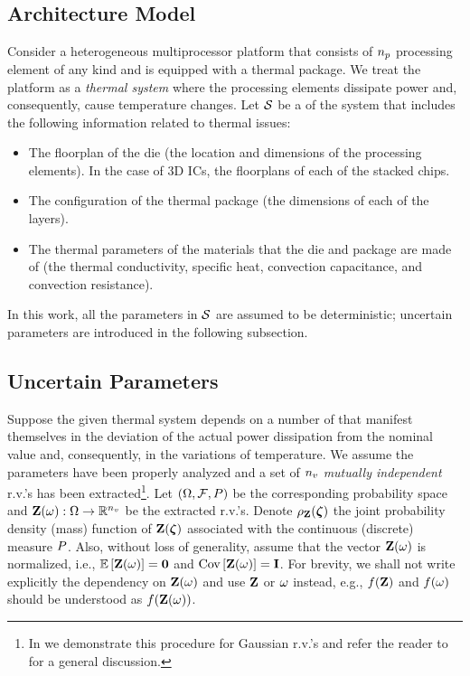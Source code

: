 \subsection{Architecture Model} 
Consider a heterogeneous multiprocessor platform that consists of ${n_p}$ processing element of any kind and is equipped with a thermal package. We treat the platform as a \emph{thermal system} where the processing elements dissipate power and, consequently, cause temperature changes. Let $\mathcal{S}$ be a  of the system that includes the following information related to thermal issues:
\begin{itemize}
  \item The floorplan of the die (the location and dimensions of the processing elements). In the case of 3D ICs, the floorplans of each of the stacked chips.
  \item The configuration of the thermal package (the dimensions of each of the layers).
  \item The thermal parameters of the materials that the die and package are made of (the thermal conductivity, specific heat, convection capacitance, and convection resistance).
\end{itemize}

In this work, all the parameters in $\mathcal{S}$ are assumed to be deterministic; uncertain parameters are introduced in the following subsection.

\subsection{Uncertain Parameters} 
Suppose the given thermal system depends on a number of  that manifest themselves in the deviation of the actual power dissipation from the nominal value and, consequently, in the variations of temperature. We assume the parameters have been properly analyzed and a set of ${n_v}$ \emph{mutually independent} r.v.'s has been extracted\footnote{In  we demonstrate this procedure for Gaussian r.v.'s and refer the reader to \cite{xiu2010} for a general discussion.}. Let $(\Omega, \mathcal{F}, P)$ be the corresponding probability space and $\mathbf{Z}(\omega): \Omega \to \mathbb{R}^{n_v}$ be the extracted r.v.'s. Denote $\rho_{\mathbf{Z}}(\boldsymbol{\zeta})$ the joint probability density (mass) function of $\mathbf{Z}(\boldsymbol{\zeta})$ associated with the continuous (discrete) measure $P$. Also, without loss of generality, assume that the vector $\mathbf{Z}(\omega)$ is normalized, i.e., $\oExp{\vZ(\o)} = \mZero$ and $\oCov{\vZ(\o)} = \mI$. For brevity, we shall not write explicitly the dependency on $\mathbf{Z}(\omega)$ and use $\mathbf{Z}$ or $\omega$ instead, e.g., $f(\mathbf{Z})$ and $f(\omega)$ should be understood as $f(\mathbf{Z}(\omega))$.

